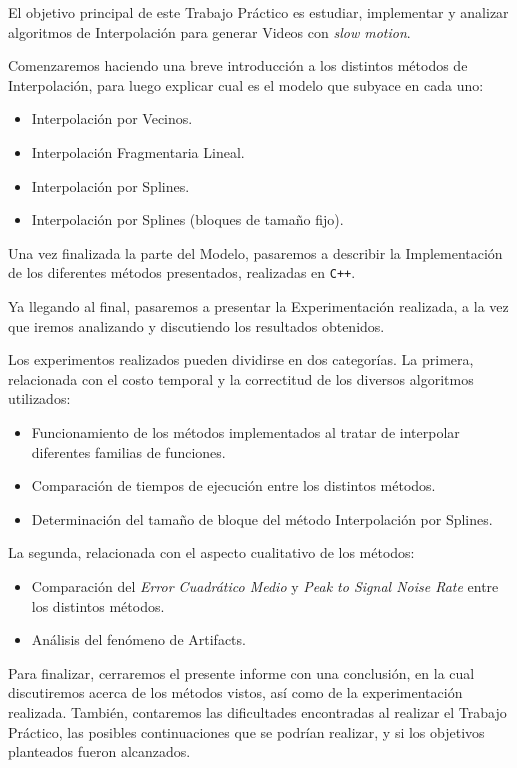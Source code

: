  El objetivo principal de este Trabajo Práctico es estudiar, implementar y analizar
 algoritmos de Interpolación para generar Videos con \textit{slow motion}.

Comenzaremos haciendo una breve introducción a los distintos métodos de Interpolación,
para luego explicar cual es el modelo que subyace en cada uno:
\begin{itemize}
    \item Interpolación por Vecinos.
    \item Interpolación Fragmentaria Lineal.
    \item Interpolación por Splines.
    \item Interpolación por Splines (bloques de tamaño fijo).
\end{itemize}

Una vez finalizada la parte del Modelo, pasaremos a describir la Implementación de los
diferentes métodos presentados, realizadas en \texttt{C++}.

Ya llegando al final, pasaremos a presentar la Experimentación realizada, a la vez
que iremos analizando y discutiendo los resultados obtenidos.

Los experimentos realizados pueden dividirse en dos categorías. La primera, relacionada
con el costo temporal y la correctitud de los diversos algoritmos utilizados:
\begin{itemize}
    \item Funcionamiento de los métodos implementados al tratar de interpolar diferentes
        familias de funciones.
    \item Comparación de tiempos de ejecución entre los distintos métodos.
    \item Determinación del tamaño de bloque del método Interpolación por Splines.
\end{itemize}

La segunda, relacionada con el aspecto cualitativo de los métodos:
\begin{itemize}
    \item Comparación del \textit{Error Cuadrático Medio} y \textit{Peak to Signal Noise Rate} entre
        los distintos métodos.
    \item Análisis del fenómeno de Artifacts.
\end{itemize}

Para finalizar, cerraremos el presente informe con una conclusión, en la cual
discutiremos acerca de los métodos vistos, así como de la experimentación realizada.
También, contaremos las dificultades encontradas al realizar el Trabajo Práctico,
las posibles continuaciones que se podrían realizar, y si los objetivos planteados
fueron alcanzados.
